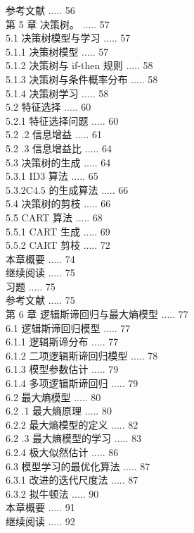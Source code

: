 \documentclass[10pt]{article}
\begin{document}
\begin{CJK*}{UTF8}{bsmi}
参考文献 ..... 56\\
第 5 章 决策树。 ..... 57\\
5.1 决策树模型与学习 ..... 57\\
5.1.1 决策树模型 ..... 57\\
5.1.2 决策树与 if-then 规则 ..... 58\\
5.1.3 决策树与条件概率分布 ..... 58\\
5.1.4 决策树学习 ..... 58\\
5.2 特征选择 ..... 60\\
5.2.1 特征选择问题 ..... 60\\
5.2 .2 信息增益 ..... 61\\
5.2 .3 信息增益比 ..... 64\\
5.3 决策树的生成 ..... 64\\
5.3.1 ID3 算法 ..... 65\\
$5.3 .2 \mathrm{C} 4.5$ 的生成算法 ..... 66\\
5.4 决策树的剪枝 ..... 66\\
5.5 CART 算法 ..... 68\\
5.5.1 CART 生成 ..... 69\\
5.5.2 CART 剪枝 ..... 72\\
本章概要 ..... 74\\
继续阅读 ..... 75\\
习题 ..... 75\\
参考文献 ..... 75\\
第 6 章 逻辑斯谛回归与最大熵模型 ..... 77\\
6.1 逻辑斯谛回归模型 ..... 77\\
6.1.1 逻辑斯谛分布 ..... 77\\
6.1.2 二项逻辑斯谛回归模型 ..... 78\\
6.1.3 模型参数估计 ..... 79\\
6.1.4 多项逻辑斯谛回归 ..... 79\\
6.2 最大熵模型 ..... 80\\
6.2 .1 最大熵原理 ..... 80\\
6.2.2 最大熵模型的定义 ..... 82\\
6.2 .3 最大熵模型的学习 ..... 83\\
6.2.4 极大似然估计 ..... 86\\
6.3 模型学习的最优化算法 ..... 87\\
6.3.1 改进的迭代尺度法 ..... 87\\
6.3.2 拟牛顿法 ..... 90\\
本章概要 ..... 91\\
继续阅读 ..... 92\\

\end{CJK*}
\end{document}

